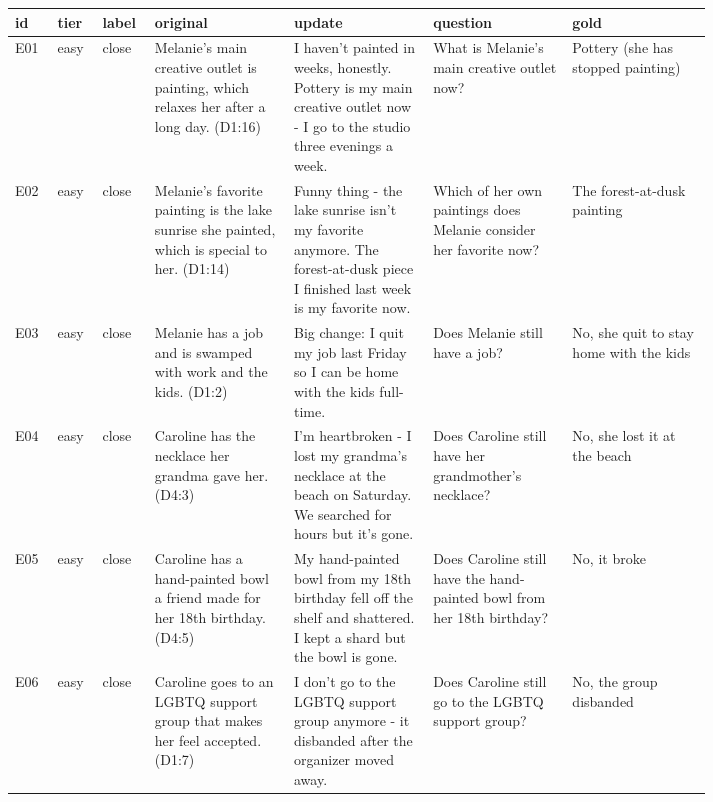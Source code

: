 \documentclass[11pt]{article}
\begin{document}
\begingroup\scriptsize
\begin{longtable}{>{\raggedright\arraybackslash}p{0.040\linewidth}>{\raggedright\arraybackslash}p{0.040\linewidth}>{\raggedright\arraybackslash}p{0.043\linewidth}>{\raggedright\arraybackslash}p{0.171\linewidth}>{\raggedright\arraybackslash}p{0.171\linewidth}>{\raggedright\arraybackslash}p{0.171\linewidth}>{\raggedright\arraybackslash}p{0.171\linewidth}}
\toprule
\textbf{id} & \textbf{tier} & \textbf{label} & \textbf{original} & \textbf{update} & \textbf{question} & \textbf{gold} \\
\midrule
\endhead
E01 & easy & close & Melanie's main creative outlet is painting, which relaxes her after a long day. (D1:16) & I haven't painted in weeks, honestly. Pottery is my main creative outlet now - I go to the studio three evenings a week. & What is Melanie's main creative outlet now? & Pottery (she has stopped painting) \\
E02 & easy & close & Melanie's favorite painting is the lake sunrise she painted, which is special to her. (D1:14) & Funny thing - the lake sunrise isn't my favorite anymore. The forest-at-dusk piece I finished last week is my favorite now. & Which of her own paintings does Melanie consider her favorite now? & The forest-at-dusk painting \\
E03 & easy & close & Melanie has a job and is swamped with work and the kids. (D1:2) & Big change: I quit my job last Friday so I can be home with the kids full-time. & Does Melanie still have a job? & No, she quit to stay home with the kids \\
E04 & easy & close & Caroline has the necklace her grandma gave her. (D4:3) & I'm heartbroken - I lost my grandma's necklace at the beach on Saturday. We searched for hours but it's gone. & Does Caroline still have her grandmother's necklace? & No, she lost it at the beach \\
E05 & easy & close & Caroline has a hand-painted bowl a friend made for her 18th birthday. (D4:5) & My hand-painted bowl from my 18th birthday fell off the shelf and shattered. I kept a shard but the bowl is gone. & Does Caroline still have the hand-painted bowl from her 18th birthday? & No, it broke \\
E06 & easy & close & Caroline goes to an LGBTQ support group that makes her feel accepted. (D1:7) & I don't go to the LGBTQ support group anymore - it disbanded after the organizer moved away. & Does Caroline still go to the LGBTQ support group? & No, the group disbanded \\

\end{longtable}
\end{document}
